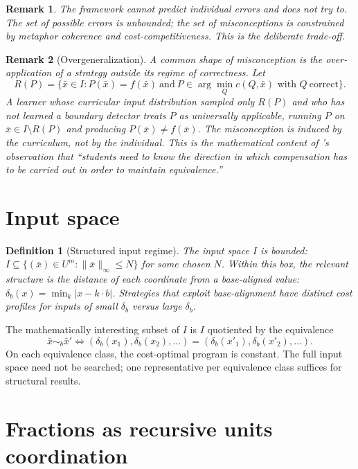\documentclass[11pt]{article}
\newtheorem{definition}{Definition}
\newtheorem{remark}{Remark}
\begin{document}
\begin{remark}
The framework cannot predict individual errors and does not try to.
The set of possible errors is unbounded; the set of misconceptions is
constrained by metaphor coherence and cost-competitiveness. This is the
deliberate trade-off.
\end{remark}

\begin{remark}[Overgeneralization]
A common shape of misconception is the over-application of a strategy
outside its regime of correctness. Let
\[
R(P) = \{\bar{x} \in I : P(\bar{x}) = f(\bar{x}) \ \text{and}\
P \in \arg\min_{Q} c(Q, \bar{x}) \text{ with } Q\ \text{correct}\}.
\]
A learner whose curricular input distribution sampled only $R(P)$ and
who has not learned a boundary detector treats $P$ as universally
applicable, running $P$ on $\bar{x} \in I \setminus R(P)$ and
producing $P(\bar{x}) \ne f(\bar{x})$. The misconception is induced by
the curriculum, not by the individual. This is the mathematical
content of \textcite{masonStephensWatson2009}'s observation that
``students need to know the direction in which compensation has to be
carried out in order to maintain equivalence.''
\end{remark}

\section{Input space}\label{sec:input-space}

\begin{definition}[Structured input regime]
The input space $I$ is bounded: $I \subseteq \{(\bar{x}) \in U^m :
\|\bar{x}\|_\infty \le N\}$ for some chosen $N$. Within this box, the
relevant structure is the distance of each coordinate from a
base-aligned value:
$\delta_b(x) = \min_k |x - k\cdot b|$.
Strategies that exploit base-alignment have distinct cost profiles for
inputs of small $\delta_b$ versus large $\delta_b$.
\end{definition}

The mathematically interesting subset of $I$ is $I$ quotiented by the
equivalence
\[
\bar{x} \sim_b \bar{x}' \iff (\delta_b(x_1), \delta_b(x_2), \dots)
= (\delta_b(x'_1), \delta_b(x'_2), \dots).
\]
On each equivalence class, the cost-optimal program is constant. The
full input space need not be searched; one representative per
equivalence class suffices for structural results.

\section{Fractions as recursive units coordination}
\label{sec:fractions}
\end{document}
